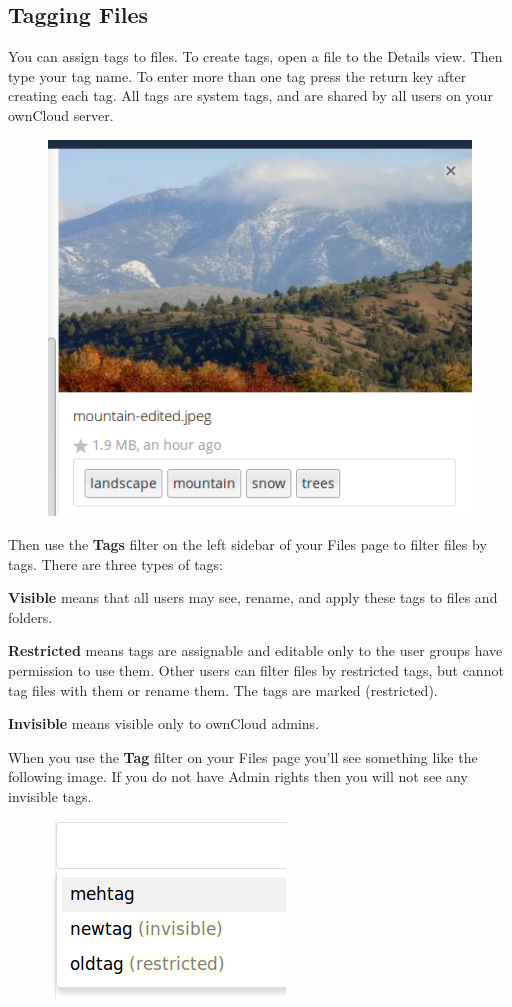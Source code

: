 \documentclass[letterpaper,10pt,english]{sphinxmanual}
\begin{document}
\subsection{Tagging Files}
\label{files/access_webgui:tagging-files}
You can assign tags to files. To create tags, open a file to the Details view.
Then type your tag name. To enter more than one tag press the return key after
creating each tag. All tags are system tags, and are shared by all users on your
ownCloud server.
\begin{figure}[htbp]
\centering

\includegraphics{files_page-7.png}
\end{figure}

Then use the \textbf{Tags} filter on the left sidebar of your Files page to filter files by tags. There are three types of tags:

\textbf{Visible} means that all users may see, rename, and apply these tags to files and folders.

\textbf{Restricted} means tags are assignable and editable only to the user groups have permission to use them. Other users can filter files by restricted tags, but cannot tag files with them or rename them. The tags are marked (restricted).

\textbf{Invisible} means visible only to ownCloud admins.

When you use the \textbf{Tag} filter on your Files page you'll see something like the following image. If you do not have Admin rights then you will not see any invisible tags.
\begin{figure}[htbp]
\centering

\includegraphics{files_page-8.png}
\end{figure}
\end{document}
